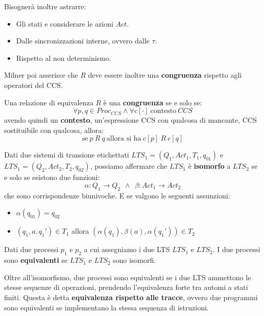 Bisognerà inoltre astrarre:
\begin{itemize}
    \item Gli stati e considerare le azioni $Act$.
    \item Dalle sincronizzazioni interne, ovvero dalle $\tau$.
    \item Rispetto al non determinismo.
\end{itemize}
Milner poi asserisce che $R$ deve essere inoltre una \textbf{congruenza} rispetto
agli operatori del CCS.
\begin{definizione}
    Una relazione di equivalenza $R$ è una \textbf{congruenza} se e solo se:
    \begin{equation}
        \forall p, q \in Proc_{CCS} \land \forall c[\cdot] \ \text{contesto} \ CCS
    \end{equation}
    avendo quindi un \textbf{contesto}, un'espressione CCS con qualcosa di mancante, CCS
    sostituibile con qualcosa, allora:
    \begin{equation}
        \text{se} \ p\ R\ q \ \text{allora si ha} \ c[p] \ R \ c[q]
    \end{equation}
\end{definizione}
Dati due sistemi di transione etichettati $LTS_1 = (Q_1, Act_1, T_1, q_{01})$ e $LTS_1 = (Q_2, Act_2, T_2, q_{02})$,
possiamo affermare che $LTS_1$ è \textbf{isomorfo} a $LTS_2$ se e solo se esistono due funzioni:
\begin{equation}
    \alpha: Q_1 \to Q_2 \ \ \land \ \ \beta: Act_1 \to Act_2
\end{equation}
che sono corrispondenze biunivoche. E se valgono le seguenti assunzioni:
\begin{itemize}
    \item $\alpha(q_{01}) = q_{02}$
    \item $(q_1, a, q_1') \in T_1$ allora $(\alpha(q_1), \beta(a), \alpha(q_1')) \in T_2$
\end{itemize}
\begin{teorema}
    Dati due processi $p_1$ e $p_2$ a cui assegniamo i due LTS $LTS_1$ e $LTS_2$.
    I due processi sono \textbf{equivalenti} se $LTS_1$ e $LTS_2$ sono isomorfi.
\end{teorema}
Oltre all'isomorfismo, due processi sono equivalenti se i due LTS ammettono le
stesse sequenze di operazioni, prendendo l'equivalenza forte tra automi a stati
finiti. Questa è detta \textbf{equivalenza rispetto alle tracce}, ovvero due
programmi sono equivalenti se implementano la stessa sequenza di istruzioni.

